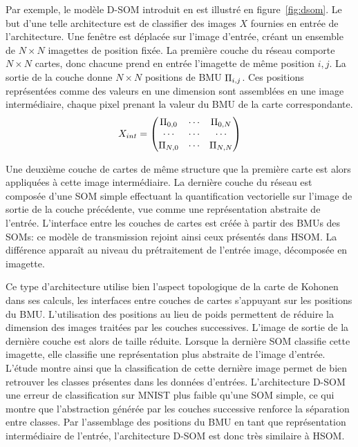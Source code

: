 \documentclass[../main]{subfiles}
\begin{document}
{Par exemple, le modèle D-SOM introduit en \cite{Liu2015DeepSM,wickramasinghe_deep_2019} est illustré en figure~\ref{fig:dsom}.
Le but d'une telle architecture est de classifier des images $X$ fournies en entrée de l'architecture.
Une fenêtre est déplacée sur l'image d'entrée, créant un ensemble de $N\times N$ imagettes de position fixée. La première couche du réseau comporte $N \times N$ cartes, donc chacune prend en entrée l'imagette de même position $i,j$.
La sortie de la couche donne $N  \times N$ positions de BMU $\Pi_{i,j}$.
Ces positions représentées comme des valeurs en une dimension sont assemblées en une image intermédiaire, chaque pixel prenant la valeur du BMU de la carte correspondante.
    $$X_{int} = \begin{pmatrix}
    \Pi_{0,0}  &  \cdots & \Pi_{0,N} \\
    \cdots & \cdots & \cdots \\
    \Pi_{N,0} & \cdots & \Pi_{N,N}
    \end{pmatrix} $$

Une deuxième couche de cartes de même structure que la première carte est alors appliquées à cette image intermédiaire. La dernière couche du réseau est composée d'une SOM simple effectuant la quantification vectorielle sur l'image de sortie de la couche précédente, vue comme une représentation abstraite  de l'entrée.
L'interface entre les couches de cartes est créée à partir des BMUs des SOMs: ce modèle de transmission rejoint ainsi ceux présentés dans HSOM. La différence apparaît au niveau du prétraitement de l'entrée image, décomposée en imagette.

Ce type d'architecture utilise bien l'aspect topologique de la carte de Kohonen dans ses calculs, les interfaces entre couches de cartes s'appuyant sur les positions du BMU. L'utilisation des positions au lieu de poids permettent de réduire la dimension des images traitées par les couches successives. L'image de sortie de la dernière couche est alors de taille réduite. Lorsque la dernière SOM classifie cette imagette, elle classifie une représentation plus abstraite de l'image d'entrée. L'étude montre ainsi que la classification de cette dernière image permet de bien retrouver les classes présentes dans les données d'entrées. L'architecture D-SOM une erreur de classification sur MNIST plus faible qu'une SOM simple, ce qui montre que l'abstraction générée par les couches successive renforce la séparation entre classes.
Par l'assemblage des positions du BMU en tant que représentation intermédiaire de l'entrée, l'architecture D-SOM est donc très similaire à HSOM.

}
\end{document}
